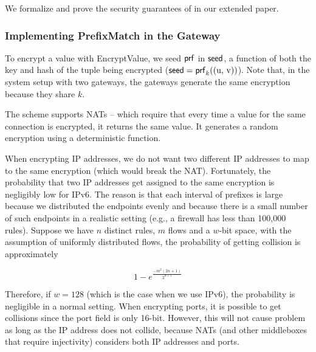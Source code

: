 We formalize and prove the security guarantees of \pmatch{} in our extended paper. 

\subsubsection{Implementing PrefixMatch in the Gateway}
\label{sec:tree}






To encrypt a value with EncryptValue, we seed $\mathsf{prf}$ in $\mathsf{seed}$, a function of both the key and hash of the tuple being encrypted ($\mathsf{seed} = \mathsf{prf}_k(\text{(u, v)})$). Note that, in the system setup with two gateways, the gateways generate the same encryption because they share $k$.  

The scheme supports NATs -- which require that every time a value for the same connection is encrypted, it returns the same value. It generates a random encryption using a deterministic function. 

When encrypting IP addresses, we do not want two different IP addresses to map to the same encryption (which would break the NAT). Fortunately, the probability that two IP addresses get assigned to the same encryption is negligibly low for IPv6.  The reason is that each interval of prefixes is large because we distributed the endpoints evenly and because there is a small number of such endpoints in a realistic setting (e.g., a firewall has less than 100,000 rules). Suppose we have $n$ distinct rules, $m$ flows and a $w$-bit space, with the assumption of uniformly distributed flows, the probability of getting collision is approximately 

\begin{equation}
1 - e^\frac{-m^2 (2n+1)}{2^{w+1}}
\end{equation}


Therefore, if $w=128$ (which is the case when we use IPv6), the probability is negligible in a normal setting. When encrypting ports, it is possible to get collisions since the port field is only 16-bit. However, this will not cause problem as long as the IP address does not collide, because NATs (and other middleboxes that require injectivity) considers both IP addresses and ports.

